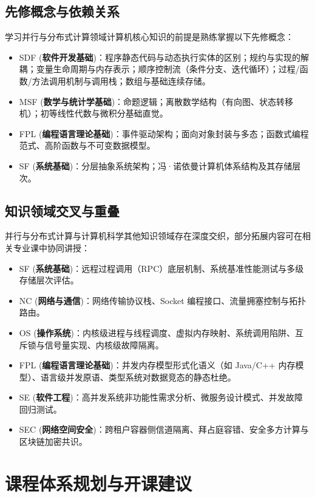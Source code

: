 \subsection{先修概念与依赖关系}
学习并行与分布式计算领域计算机核心知识的前提是熟练掌握以下先修概念：
\begin{itemize}
    \item SDF (\textbf{软件开发基础})：程序静态代码与动态执行实体的区别；规约与实现的解耦；变量生命周期与内存表示；顺序控制流（条件分支、迭代循环）；过程/函数/方法调用机制与调用栈；数组与基础连续存储。
    \item MSF (\textbf{数学与统计学基础})：命题逻辑；离散数学结构（有向图、状态转移机）；初等线性代数与微积分基础直觉。
    \item FPL (\textbf{编程语言理论基础})：事件驱动架构；面向对象封装与多态；函数式编程范式、高阶函数与不可变数据模型。
    \item SF (\textbf{系统基础})：分层抽象系统架构；冯·诺依曼计算机体系结构及其存储层次。
\end{itemize}

\subsection{知识领域交叉与重叠}
并行与分布式计算与计算机科学其他知识领域存在深度交织，部分拓展内容可在相关专业课中协同讲授：
\begin{itemize}
    \item SF (\textbf{系统基础})：远程过程调用（RPC）底层机制、系统基准性能测试与多级存储层次评估。
    \item NC (\textbf{网络与通信})：网络传输协议栈、Socket 编程接口、流量拥塞控制与拓扑路由。
    \item OS (\textbf{操作系统})：内核级进程与线程调度、虚拟内存映射、系统调用陷阱、互斥锁与信号量实现、内核级故障隔离。
    \item FPL (\textbf{编程语言理论基础})：并发内存模型形式化语义（如 Java/C++ 内存模型）、语言级并发原语、类型系统对数据竞态的静态杜绝。
    \item SE (\textbf{软件工程})：高并发系统非功能性需求分析、微服务设计模式、并发故障回归测试。
    \item SEC (\textbf{网络空间安全})：跨租户容器侧信道隔离、拜占庭容错、安全多方计算与区块链加密共识。
\end{itemize}

\section{课程体系规划与开课建议}

